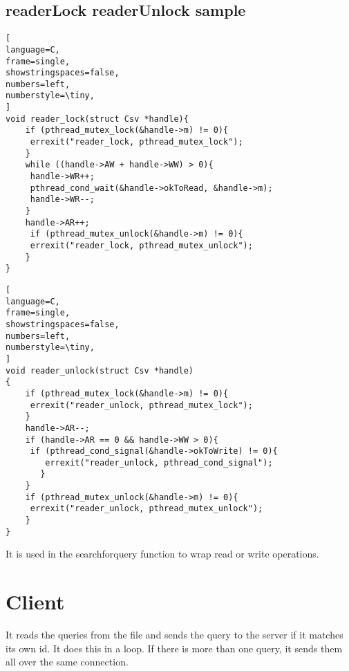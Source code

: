 \documentclass[15pt]{scrartcl} %
\begin{document}
\subsection{readerLock readerUnlock sample}

\begin{lstlisting}[
language=C,
frame=single,
showstringspaces=false,
numbers=left,
numberstyle=\tiny,
]
void reader_lock(struct Csv *handle){
    if (pthread_mutex_lock(&handle->m) != 0){
     errexit("reader_lock, pthread_mutex_lock");
    }
    while ((handle->AW + handle->WW) > 0){
     handle->WR++;
     pthread_cond_wait(&handle->okToRead, &handle->m);
     handle->WR--;
    }
    handle->AR++;
     if (pthread_mutex_unlock(&handle->m) != 0){
     errexit("reader_lock, pthread_mutex_unlock");
    }
}
\end{lstlisting}

\begin{lstlisting}[
language=C,
frame=single,
showstringspaces=false,
numbers=left,
numberstyle=\tiny,
]
void reader_unlock(struct Csv *handle)
{
    if (pthread_mutex_lock(&handle->m) != 0){
     errexit("reader_unlock, pthread_mutex_lock");
    }
    handle->AR--;
    if (handle->AR == 0 && handle->WW > 0){
     if (pthread_cond_signal(&handle->okToWrite) != 0){
        errexit("reader_unlock, pthread_cond_signal");
       }
    }
    if (pthread_mutex_unlock(&handle->m) != 0){
     errexit("reader_unlock, pthread_mutex_unlock");
    }
}
\end{lstlisting}

It is used in the searchforquery function to wrap read or write operations.

\section{\huge Client}

It reads the queries from the file and sends the query to the server if it matches its own id. It does this in a loop. If there is more than one query, it sends them all over the same connection.
\end{document}
